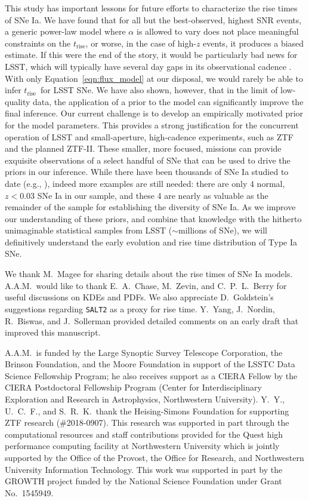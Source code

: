 \documentclass[twocolumn]{aastex63}
\newcommand{\trise}{$t_\mathrm{rise}$}
\begin{document}
This study has important lessons for future efforts to characterize the rise
times of SNe Ia. We have found that for all but the best-observed, highest SNR
events, a generic power-law model where $\alpha$ is allowed to vary does not
place meaningful constraints on the \trise, or worse, in the case of high-$z$
events, it produces a biased estimate. If this were the end of the story, it
would be particularly bad news for LSST, which will typically have several day
gaps in its observational cadence \citep{Ivezic08}. With only
Equation~\ref{eqn:flux_model} at our disposal, we would rarely be able to
infer \trise\ for LSST SNe. We have also shown, however, that in the limit of
low-quality data, the application of a prior to the model can significantly
improve the final inference. Our current challenge is to develop an
empirically motivated prior for the model parameters. This provides a strong
justification for the concurrent operation of LSST and small-aperture,
high-cadence experiments, such as ZTF and the planned ZTF-II. These smaller,
more focused, missions can provide exquisite observations of a select handful
of SNe that can be used to drive the priors in our inference. While there have
been thousands of SNe Ia studied to date (e.g., \citealt{Jones17}), indeed
more examples are still needed: there are only 4 normal, $z < 0.03$ SNe Ia in
our sample, and these 4 are nearly as valuable as the remainder of the sample
for establishing the diversity of SNe Ia. As we improve our understanding of
these priors, and combine that knowledge with the hitherto unimaginable
statistical samples from LSST ($\sim$millions of SNe), we will definitively
understand the early evolution and rise time distribution of Type Ia SNe.

\acknowledgements

We thank M.~Magee for sharing details about the rise times of SNe Ia models.
A.A.M.~would like to thank E.~A.~Chase, M.~Zevin, and C.~P.~L.~Berry for
useful discussions on KDEs and PDFs. We also appreciate D.~Goldstein's
suggestions regarding \texttt{SALT2} as a proxy for rise time. Y.~Yang,
J.~Nordin, R.~Biswas, and J.~Sollerman provided detailed comments on an early
draft that improved this manuscript.

A.A.M.~is funded by the Large Synoptic Survey Telescope Corporation, the
Brinson Foundation, and the Moore Foundation in support of the LSSTC Data
Science Fellowship Program; he also receives support as a CIERA Fellow by the
CIERA Postdoctoral Fellowship Program (Center for Interdisciplinary
Exploration and Research in Astrophysics, Northwestern University). Y.~Y.,
U.~C.~F., and S.~R.~K.~thank the Heising-Simons Foundation for supporting ZTF
research (\#2018-0907). This research was supported in part through the
computational resources and staff contributions provided for the Quest high
performance computing facility at Northwestern University which is jointly
supported by the Office of the Provost, the Office for Research, and
Northwestern University Information Technology. This work was supported in
part by the GROWTH project funded by the National Science Foundation under
Grant No.~1545949.
\end{document}

